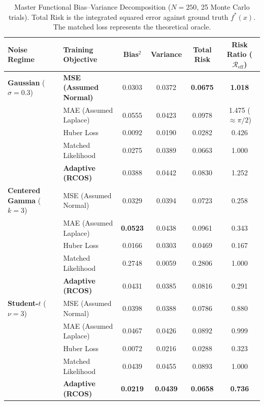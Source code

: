 \begin{table}[H]
  \centering
  \caption{Master Functional Bias--Variance Decomposition ($N=250$, 25 Monte Carlo trials). Total Risk is the integrated squared error against ground truth $f^*(x)$. The matched loss represents the theoretical oracle.}
  \label{tab:nn_bias_variance}
  \vspace{6pt}
  \begin{tabular}{llcccc}
    \toprule
    \textbf{Noise Regime} & \textbf{Training Objective} & \textbf{Bias}$^2$ & \textbf{Variance} & \textbf{Total Risk} & \textbf{Risk Ratio} ($\mathcal{R}_{\text{eff}}$) \\
    \midrule
    \textbf{Gaussian} ($\sigma=0.3$) 
      & \textbf{MSE (Assumed Normal)} & 0.0303 & 0.0372 & \textbf{0.0675} & \textbf{1.018} \\
      & MAE (Assumed Laplace)        & 0.0555 & 0.0423 & 0.0978 & 1.475 ($\approx \pi/2$) \\
      & Huber Loss                   & 0.0092 & 0.0190 & 0.0282 & 0.426 \\
      & Matched Likelihood           & 0.0275 & 0.0389 & 0.0663 & 1.000 \\
      & \textbf{Adaptive (RCOS)}     & 0.0388 & 0.0442 & 0.0830 & 1.252 \\
    \midrule
    \textbf{Centered Gamma} ($k=3$) 
      & MSE (Assumed Normal)         & 0.0329 & 0.0394 & 0.0723 & 0.258 \\
      & MAE (Assumed Laplace)        & \textbf{0.0523} & 0.0438 & 0.0961 & 0.343 \\
      & Huber Loss                   & 0.0166 & 0.0303 & 0.0469 & 0.167 \\
      & Matched Likelihood           & 0.2748 & 0.0059 & 0.2806 & 1.000 \\
      & \textbf{Adaptive (RCOS)}     & 0.0431 & 0.0385 & 0.0816 & 0.291 \\
    \midrule
    \textbf{Student-$t$} ($\nu=3$) 
      & MSE (Assumed Normal)         & 0.0398 & 0.0388 & 0.0786 & 0.880 \\
      & MAE (Assumed Laplace)        & 0.0467 & 0.0426 & 0.0892 & 0.999 \\
      & Huber Loss                   & 0.0072 & 0.0216 & 0.0288 & 0.323 \\
      & Matched Likelihood           & 0.0439 & 0.0455 & 0.0893 & 1.000 \\
      & \textbf{Adaptive (RCOS)}     & \textbf{0.0219} & \textbf{0.0439} & \textbf{0.0658} & \textbf{0.736} \\
    \bottomrule
  \end{tabular}
\end{table}

